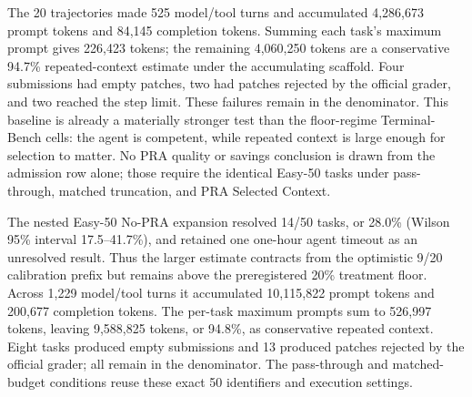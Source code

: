 \documentclass[11pt]{article}
\begin{document}
The 20 trajectories made 525 model/tool turns and accumulated 4,286,673 prompt
tokens and 84,145 completion tokens. Summing each task's maximum prompt gives
226,423 tokens; the remaining 4,060,250 tokens are a conservative 94.7\%
repeated-context estimate under the accumulating scaffold. Four submissions
had empty patches, two had patches rejected by the official grader, and two
reached the step limit. These failures remain in the denominator. This baseline
is already a materially stronger test than the floor-regime Terminal-Bench
cells: the agent is competent, while repeated context is large enough for
selection to matter. No PRA quality or savings conclusion is drawn from the
admission row alone; those require the identical Easy-50 tasks under
pass-through, matched truncation, and PRA Selected Context.

The nested Easy-50 No-PRA expansion resolved 14/50 tasks, or 28.0\% (Wilson
95\% interval 17.5--41.7\%), and retained one one-hour agent timeout as an
unresolved result. Thus the larger estimate contracts from the optimistic
9/20 calibration prefix but remains above the preregistered 20\% treatment
floor. Across 1,229 model/tool turns it accumulated 10,115,822 prompt tokens
and 200,677 completion tokens. The per-task maximum prompts sum to 526,997
tokens, leaving 9,588,825 tokens, or 94.8\%, as conservative repeated context.
Eight tasks produced empty submissions and 13 produced patches rejected by the
official grader; all remain in the denominator. The pass-through and
matched-budget conditions reuse these exact 50 identifiers and execution
settings.
\end{document}

